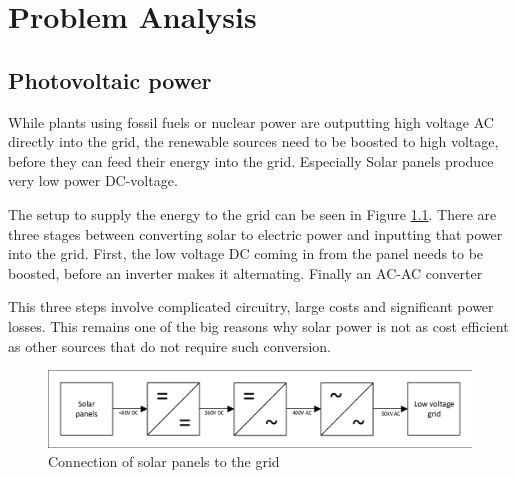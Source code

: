 \chapter{Problem Analysis}\label{ch:probdesc}



\section{Photovoltaic power}
While plants using fossil fuels or nuclear power are outputting high voltage AC directly into the grid, the renewable sources need to be boosted to high voltage, before they can feed their energy into the grid. 
Especially Solar panels produce very low power DC-voltage. 

The setup to supply the energy to the grid can be seen in Figure \ref{fig:SolarConverters}.
There are three stages between converting solar to electric power and inputting that power into the grid. 
First, the low voltage DC coming in from the panel needs to be boosted, before an inverter makes it alternating. Finally  an AC-AC converter 

This three steps involve complicated circuitry, large costs and significant power losses. 
This remains one of the big reasons why solar power is not as cost efficient as other sources that do not require such conversion.

\begin{figure}[H]
   \centering
   \includegraphics[width=\textwidth]{figures/Problem/SolarConverters.pdf}
    \caption{Connection of solar panels to the grid}
	\label{fig:SolarConverters}
\end{figure}

